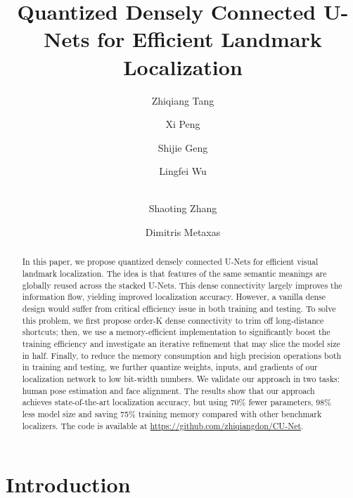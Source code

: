 \documentclass[runningheads]{llncs}
\begin{document}
\title{Quantized Densely Connected U-Nets for Efficient Landmark Localization}

\author{Zhiqiang Tang \and
Xi Peng \and
Shijie Geng \and Lingfei Wu \and \\Shaoting Zhang \and Dimitris Metaxas}



\maketitle

\begin{abstract}


  


  In this paper, we propose quantized densely connected U-Nets for efficient visual landmark localization. The idea is that features of the same semantic meanings are globally reused across the stacked U-Nets. This dense connectivity largely improves the information flow, yielding improved localization accuracy. However, a vanilla dense design would suffer from critical efficiency issue in both training and testing. To solve this problem, we first propose order-K dense connectivity to trim off long-distance shortcuts; then, we use a memory-efficient implementation to significantly boost the training efficiency and investigate an iterative refinement that may slice the model size in half. 
Finally, to reduce the memory consumption and high precision operations both in training and testing, we further quantize weights, inputs, and gradients of our localization network to low bit-width numbers.
  We validate our approach in two tasks: human pose estimation and face alignment. The results show that our approach achieves state-of-the-art localization accuracy, but using 70\% fewer parameters, 98\% less model size and saving 75\% training memory compared with other benchmark localizers. The code is available at \href{https://github.com/zhiqiangdon/CU-Net}{https://github.com/zhiqiangdon/CU-Net}. 
  


\end{abstract} \section{Introduction}
\end{document}
